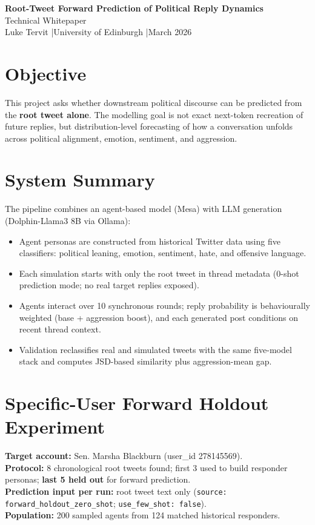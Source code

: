 \documentclass[10pt]{article}
\begin{document}
\small

\begin{center}
{\Large\bfseries Root-Tweet Forward Prediction of Political Reply Dynamics}\\[0.25em]
{\normalsize Technical Whitepaper}\\[0.2em]
Luke Tervit \quad|\quad University of Edinburgh \quad|\quad March 2026
\end{center}

\section{Objective}
This project asks whether downstream political discourse can be predicted from the \textbf{root tweet alone}. The modelling goal is not exact next-token recreation of future replies, but distribution-level forecasting of how a conversation unfolds across political alignment, emotion, sentiment, and aggression.

\section{System Summary}
The pipeline combines an agent-based model (Mesa) with LLM generation (Dolphin-Llama3 8B via Ollama):
\begin{itemize}
  \item Agent personas are constructed from historical Twitter data using five classifiers: political leaning, emotion, sentiment, hate, and offensive language.
  \item Each simulation starts with only the root tweet in thread metadata (0-shot prediction mode; no real target replies exposed).
  \item Agents interact over 10 synchronous rounds; reply probability is behaviourally weighted (base + aggression boost), and each generated post conditions on recent thread context.
  \item Validation reclassifies real and simulated tweets with the same five-model stack and computes JSD-based similarity plus aggression-mean gap.
\end{itemize}

\section{Specific-User Forward Holdout Experiment}
\textbf{Target account:} Sen. Marsha Blackburn (user\_id 278145569).\\
\textbf{Protocol:} 8 chronological root tweets found; first 3 used to build responder personas; \textbf{last 5 held out} for forward prediction.\\
\textbf{Prediction input per run:} root tweet text only (\texttt{source: forward\_holdout\_zero\_shot}; \texttt{use\_few\_shot: false}).\\
\textbf{Population:} 200 sampled agents from 124 matched historical responders.
\end{document}
